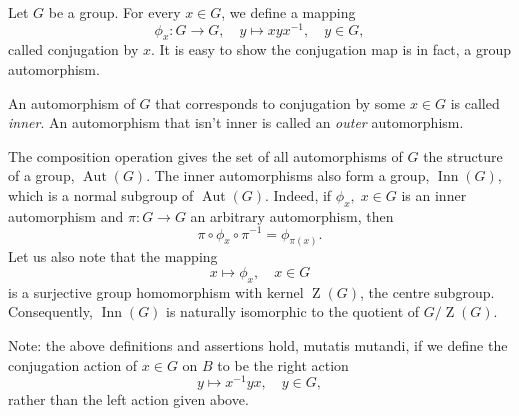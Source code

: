 \documentclass[12pt]{article}
\begin{document}
Let $G$ be a group.  For every $x\in G$, we define a
mapping
$$\phi_x:G\rightarrow G,\quad y\mapsto x y x^{-1},\quad y\in G,$$
called conjugation by $x$.
It is easy to show the conjugation map is in fact, a group automorphism.

An automorphism of $G$ that corresponds to conjugation by some
$x\in G$ is called \emph{inner}. An automorphism that isn't inner is called
an \emph{outer} automorphism.  

The composition operation gives the set of all automorphisms of $G$
the structure of a group, $\operatorname{Aut}(G)$.  The inner
automorphisms also form a group, $\operatorname{Inn}(G)$, which is a
normal subgroup of $\operatorname{Aut}(G)$.  Indeed, if $\phi_x,\;
x\in G$ is an inner automorphism and $\pi:G\rightarrow G$ an arbitrary
automorphism, then
$$\pi\circ \phi_x \circ\pi^{-1} = \phi_{\pi(x)}.$$
Let us also note that the mapping 
$$x\mapsto \phi_x,\quad x\in G$$
is a surjective group homomorphism with kernel
$\operatorname{Z}(G)$, the centre subgroup. Consequently,
$\operatorname{Inn}(G)$ is naturally isomorphic to the quotient of
$G/\operatorname{Z}(G)$.

Note:  the above definitions and assertions hold, mutatis mutandi, if we define 
the conjugation action of $x\in G$ on $B$ to be the right action
\[ y\mapsto x^{-1} y x,\quad y\in G,\]
rather than the left action given above.
\end{document}
